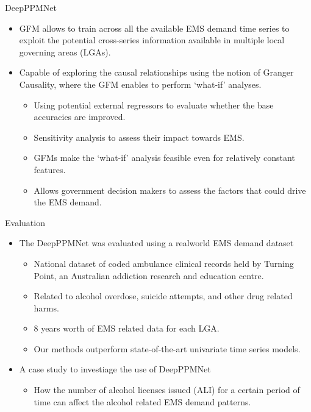 \documentclass{beamer}
\begin{document}
\begin{frame}{DeepPPMNet}
	\begin{itemize}
	\item GFM allows to train across all the available EMS demand time series to exploit the potential cross-series information available in multiple local governing areas (LGAs).
	\vspace{4mm}
	\item Capable of exploring the causal relationships using the notion of Granger Causality, where the GFM enables to perform ‘what-if’ analyses.
	\begin{itemize}\color{blue}
		\item Using potential external regressors to evaluate whether the
base accuracies are improved.
		\item Sensitivity analysis to assess their impact towards EMS.
		\item GFMs make the ‘what-if’ analysis feasible even for relatively
constant features.
		\item Allows government decision makers to assess the factors that
could drive the EMS demand.
	\end{itemize}
\end{itemize}
\end{frame}

\begin{frame}{Evaluation}
	\begin{itemize}
	\item The DeepPPMNet was evaluated using a realworld EMS demand dataset
	\vspace{1mm}
	\begin{itemize}\color{blue}
		\item National dataset of coded ambulance clinical records held by Turning Point, an Australian addiction research and education centre.
		\item Related to alcohol overdose, suicide attempts, and other drug related harms.
		\item 8 years worth of EMS related data for each LGA.
		\item Our methods outperform state-of-the-art univariate time series models.
	\end{itemize}
	\item A case study to investiage the use of DeepPPMNet
	\vspace{2mm}
	\begin{itemize}\color{blue}
		\item How the number of alcohol licenses issued (ALI) for a certain period of time can affect the alcohol related EMS demand patterns.
	\end{itemize}
\end{itemize}
\end{frame}
\end{document}
